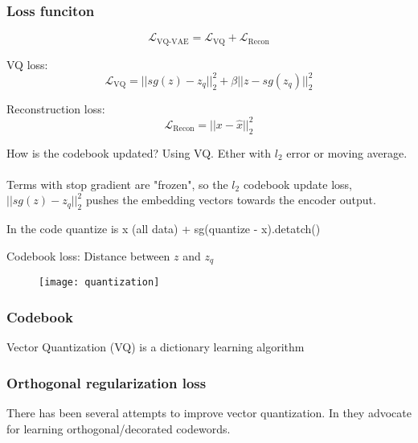 \documentclass[../../thesis.tex]{subfiles}
\begin{document}
\subsubsection{Loss funciton}
\begin{equation}
    \mathcal{L}_{\text{VQ-VAE}} = \mathcal{L}_{\text{VQ}} + \mathcal{L}_{\text{Recon}}
\end{equation}


VQ loss: 
\begin{equation}
    \mathcal{L}_{\text{VQ}} = ||sg(z) - z_q||_2^2 +\beta||z - sg(z_q)||_2^2
\end{equation}
     
Reconstruction loss:
\begin{equation}
    \mathcal{L}_{\text{Recon}} = ||x - \widehat{x}||_2^2
\end{equation}

How is the codebook updated? Using VQ. Ether with $l_2$ error or moving average. \\\\

Terms with stop gradient are "frozen", so the $l_2$ codebook update loss, $||sg(z) - z_q ||_2^2$ pushes the embedding vectors towards the encoder output. 

In the code quantize is x (all data) + sg(quantize - x).detatch()



Codebook loss: Distance between $z$ and $z_q$ 


\begin{figure}[h]
    \texttt{[image: quantization]}
    \centering    
\end{figure}





\subsubsection{Codebook}
Vector Quantization (VQ) is a dictionary learning algorithm 

\subsubsection{Orthogonal regularization loss}
There has been several attempts to improve vector quantization. In \cite{shin2023exploration} they advocate for learning orthogonal/decorated codewords. 
\end{document}
